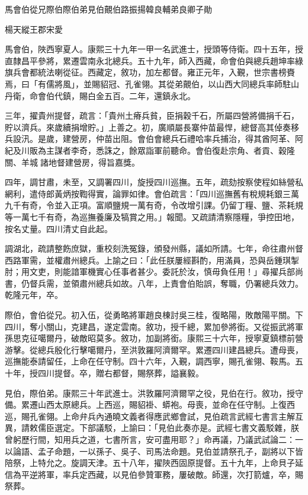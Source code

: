 
\begin{pinyinscope}
馬會伯從兄際伯際伯弟見伯覿伯路振揚韓良輔弟良卿子勛

楊天縱王郡宋愛

馬會伯，陜西寧夏人。康熙三十九年一甲一名武進士，授頭等侍衛。四十五年，授直隸昌平參將，累遷雲南永北總兵。五十九年，師入西藏，命會伯與總兵趙坤率綠旗兵會都統法喇從征。西藏定，敘功，加左都督。雍正元年，入覲，世宗書榜賚焉，曰「有儒將風」，並賜貂冠、孔雀翎。其從弟覿伯，以山西大同總兵率師駐山丹衛，命會伯代鎮，賜白金五百。二年，還鎮永北。

三年，擢貴州提督，疏言：「貴州土瘠兵貧，臣捐穀千石，所屬四營將備捐千石，貯以濟兵。來歲續捐增貯。」上善之。初，廣順屬長寨仲苗最悍，總督高其倬奏移兵設汛。是歲，建營房，仲苗出阻。會伯會總兵石禮哈率兵捕治，得其酋阿革、阿紀及川販為主謀者李奇，悉誅之，餘眾詣軍前聽命。會伯復赴宗角、者貢、穀隆關、羊城諸地督建營房，得旨嘉獎。

四年，調甘肅，未至，又調署四川，旋授四川巡撫。五年，疏劾按察使程如絲營私網利，遣侍郎黃炳按鞫得實，論罪如律。會伯疏言：「四川巡撫舊有稅規耗銀三萬九千有奇，令並入正項。富順鹽規一萬有奇，令改增引課。仍留丁糧、鹽、茶耗規等一萬七千有奇，為巡撫養廉及犒賞之用。」報聞。又疏請清察隱糧，爭控田地，按名丈量。四川清丈自此起。

調湖北，疏請整飭庶獄，重校刻洗冤錄，頒發州縣，議如所請。七年，命往肅州督西路軍需，並權肅州總兵。上諭之曰：「此任朕屢經斟酌，用滿員，恐與岳鍾琪掣肘；用文吏，則能諳軍機實心任事者甚少。委託於汝，慎毋負任用！」尋擢兵部尚書，仍督兵需，並領肅州總兵如故。八年，上責會伯貽誤，奪職，仍署總兵效力。乾隆元年，卒。

際伯，會伯從兄。初入伍，從勇略將軍趙良棟討吳三桂，復略陽，敗敵陽平關。下四川，奪小關山，克建昌，遂定雲南。敘功，授千總，累加參將銜。又從振武將軍孫思克征噶爾丹，破敵昭莫多。敘功，加副將銜。康熙三十六年，授寧夏鎮標前營游擊。從總兵殷化行擊噶爾丹，至洪敦羅阿濟爾罕。累遷四川建昌總兵。遭母喪，巡撫能泰請留任，上命在任守制。四十六年，入覲，調西寧，賜孔雀翎、鞍馬。五十年，授四川提督。卒，贈右都督，賜祭葬，謚襄毅。

見伯，際伯弟。康熙三十年武進士。洪敦羅阿濟爾罕之役，見伯在行。敘功，授守備。累遷山西太原總兵。上西巡，賜貂褂、蟒袍。母喪，並命在任守制。上復西巡，賜孔雀翎。上命弁兵內通曉文義者得應武鄉會試，見伯疏言武經七書言主解互異，請敕儒臣選定。下部議駁，上諭曰：「見伯此奏亦是。武經七書文義駁雜，朕曾躬歷行間，知用兵之道，七書所言，安可盡用耶？」命再議，乃議武試論二：一以論語、孟子命題，一以孫子、吳子、司馬法命題。見伯並請祭孔子，副將以下皆陪祭，上特允之。旋調天津。五十八年，擢陜西固原提督。五十九年，上命貝子延信為平逆將軍，率兵定西藏，以見伯參贊軍務，屢破敵。師還，次打箭爐，卒，賜祭葬。


\end{pinyinscope}
